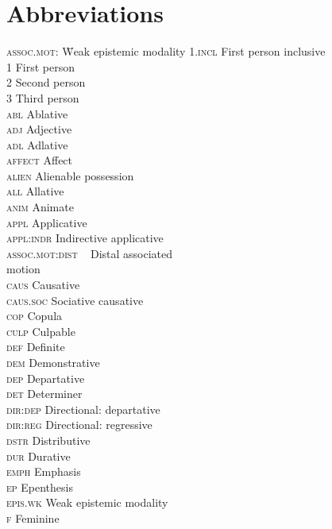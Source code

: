 \documentclass[output=paper]{LSP/langsci}
\begin{document}
\section*{Abbreviations}
\begin{multicols}{2}
\begin{tabbing}
\textsc{assoc.mot:} \=  Weak epistemic modality \kill
\textsc{1.incl} \>  First person inclusive\\
1 \>  First person\\
2 \>  Second person\\
3 \>  Third person\\
\textsc{abl} \>  Ablative\\
\textsc{adj} \>  Adjective\\
\textsc{adl} \>  Adlative\\
\textsc{affect} \>  Affect\\
\textsc{alien} \>  Alienable possession\\
\textsc{all} \>  Allative\\
\textsc{anim} \>  Animate\\
\textsc{appl} \>  Applicative\\
\textsc{appl:indr}  \>  Indirective applicative\\
\textsc{assoc.mot:dist} ~ Distal associated\\
            \>  motion\\
\textsc{caus} \>  Causative\\
\textsc{caus.soc}  \>  Sociative causative\\
\textsc{cop} \>  Copula\\
\textsc{culp} \>  Culpable\\
\textsc{def} \>  Definite\\
\textsc{dem} \>  Demonstrative\\
\textsc{dep} \>  Departative\\
\textsc{det} \>  Determiner\\
\textsc{dir:dep} \>   Directional: departative\\
\textsc{dir:reg} \>   Directional: regressive\\
\textsc{dstr} \>  Distributive\\
\textsc{dur} \>  Durative\\
\textsc{emph} \>  Emphasis\\
\textsc{ep} \>  Epenthesis\\
\textsc{epis.wk}  \>  Weak epistemic modality\\
\textsc{f} \>  Feminine\\

\end{tabbing}
\end{multicols}
\end{document}
